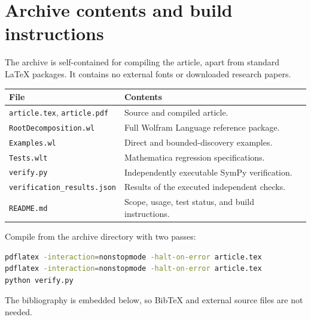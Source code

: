\documentclass[11pt,a4paper]{article}
\newcommand{\code}[1]{\texttt{#1}}
\theoremstyle{definition}
\theoremstyle{remark}
\begin{document}
\section{Archive contents and build instructions}
The archive is self-contained for compiling the article, apart from standard LaTeX packages. It contains no external fonts or downloaded research papers.
\begin{center}
\small
\begin{tabular}{@{}p{}p{}@{}}
\toprule
File & Contents\\
\midrule
\code{article.tex}, \code{article.pdf} & Source and compiled article.\\
\code{RootDecomposition.wl} & Full Wolfram Language reference package.\\
\code{Examples.wl} & Direct and bounded-discovery examples.\\
\code{Tests.wlt} & Mathematica regression specifications.\\
\code{verify.py} & Independently executable SymPy verification.\\
\code{verification\_results.json} & Results of the executed independent checks.\\
\code{README.md} & Scope, usage, test status, and build instructions.\\
\bottomrule
\end{tabular}
\end{center}
Compile from the archive directory with two passes:
\begin{lstlisting}[language=bash]
pdflatex -interaction=nonstopmode -halt-on-error article.tex
pdflatex -interaction=nonstopmode -halt-on-error article.tex
python verify.py
\end{lstlisting}
The bibliography is embedded below, so BibTeX and external source files are not needed.
\end{document}
